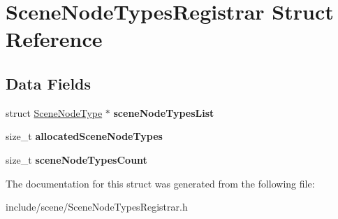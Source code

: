 \hypertarget{struct_scene_node_types_registrar}{}\section{Scene\+Node\+Types\+Registrar Struct Reference}
\label{struct_scene_node_types_registrar}
\subsection*{Data Fields}
\begin{DoxyCompactItemize}
\item 
\hypertarget{struct_scene_node_types_registrar_a26220f07d07585c20b71ddab90783db6}{}\label{struct_scene_node_types_registrar_a26220f07d07585c20b71ddab90783db6} 
struct \hyperlink{struct_scene_node_type}{Scene\+Node\+Type} $\ast$ {\bfseries scene\+Node\+Types\+List}
\item 
\hypertarget{struct_scene_node_types_registrar_a5a1d22eb74c59dd10779143e8b799dd0}{}\label{struct_scene_node_types_registrar_a5a1d22eb74c59dd10779143e8b799dd0} 
size\+\_\+t {\bfseries allocated\+Scene\+Node\+Types}
\item 
\hypertarget{struct_scene_node_types_registrar_a431a77356de72071ae14aaf0fdd5894d}{}\label{struct_scene_node_types_registrar_a431a77356de72071ae14aaf0fdd5894d} 
size\+\_\+t {\bfseries scene\+Node\+Types\+Count}
\end{DoxyCompactItemize}


The documentation for this struct was generated from the following file\+:\begin{DoxyCompactItemize}
\item 
include/scene/Scene\+Node\+Types\+Registrar.\+h\end{DoxyCompactItemize}
